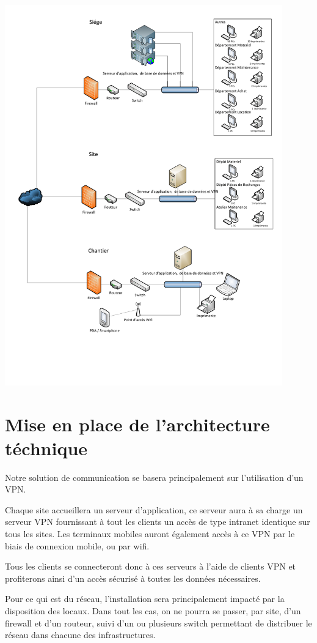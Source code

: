 \includegraphics[width=0.9\textwidth]{img/schema-gstp.pdf}

\section{Mise en place de l'architecture téchnique}

    Notre solution de communication se basera principalement sur l'utilisation d'un VPN.

    Chaque site accueillera un serveur d'application, ce serveur aura à sa charge un serveur VPN fournissant à tout les clients un accès de type intranet identique sur tous les sites.
    Les terminaux mobiles auront également accès à ce VPN par le biais de connexion mobile, ou par wifi.

    Tous les clients se connecteront donc à ces serveurs à l'aide de clients VPN et profiterons ainsi d'un accès sécurisé à toutes les données nécessaires.

    Pour ce qui est du réseau, l'installation sera principalement impacté par la disposition des locaux.
    Dans tout les cas, on ne pourra se passer, par site, d'un firewall et d'un routeur, suivi d'un ou plusieurs switch permettant de distribuer le réseau dans chacune des infrastructures.

